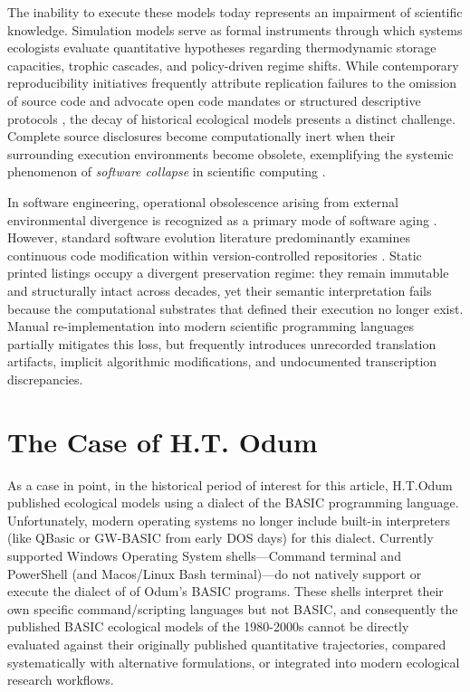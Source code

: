 \documentclass[3p,times,authoryear,twocolumn]{elsarticle}
\begin{document}
The inability to execute these models today represents an impairment of scientific knowledge. Simulation models serve as formal instruments through which systems ecologists evaluate quantitative hypotheses regarding thermodynamic storage capacities, trophic cascades, and policy-driven regime shifts. While contemporary reproducibility initiatives frequently attribute replication failures to the omission of source code and advocate open code mandates \citep{peng2011,ince2012} or structured descriptive protocols \citep{grimm2010}, the decay of historical ecological models presents a distinct challenge. Complete source disclosures become computationally inert when their surrounding execution environments become obsolete, exemplifying the systemic phenomenon of \textit{software collapse} in scientific computing \citep{hinsen2019}.

In software engineering, operational obsolescence arising from external environmental divergence is recognized as a primary mode of software aging \citep{parnas1994}. However, standard software evolution literature predominantly examines continuous code modification within version-controlled repositories \citep{lehman1980,robles2005,spinellis2021}. Static printed listings occupy a divergent preservation regime: they remain immutable and structurally intact across decades, yet their semantic interpretation fails because the computational substrates that defined their execution no longer exist. Manual re-implementation into modern scientific programming languages partially mitigates this loss, but frequently introduces unrecorded translation artifacts, implicit algorithmic modifications, and undocumented transcription discrepancies.

\section{The Case of H.T. Odum}
\label{sec:odum}

As a case in point, in the historical period of interest for this article, H.T.Odum published ecological models using a dialect of the BASIC programming language. Unfortunately, modern operating systems no longer include built-in interpreters (like QBasic or GW-BASIC from early DOS days) for this dialect. Currently supported Windows Operating System shells---Command terminal and PowerShell (and Macos/Linux Bash terminal)---do not natively support or execute the dialect of of Odum's BASIC programs. These shells interpret their own specific command/scripting languages but not BASIC, and consequently the published BASIC ecological models of the 1980-2000s cannot be directly evaluated against their originally published quantitative trajectories, compared systematically with alternative formulations, or integrated into modern ecological research workflows.
\end{document}
